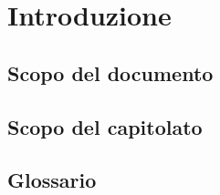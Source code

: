 \section{Introduzione}
\subsection{Scopo del documento}
\subsection{Scopo del capitolato}
\subsection{Glossario}
